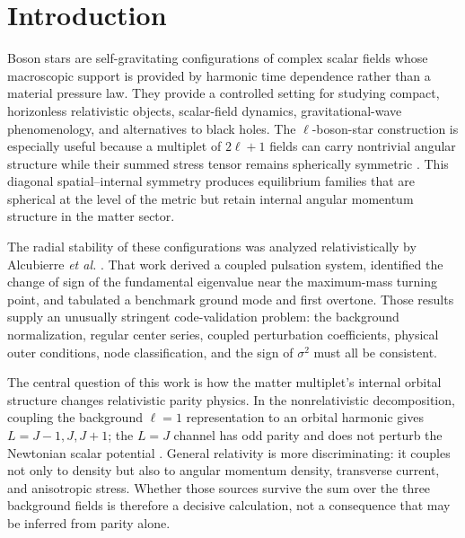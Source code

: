 \documentclass[aps,prd,preprint,onecolumn,nofootinbib,superscriptaddress,showkeys]{revtex4-2}
\newcommand{\sigmatwo}{\sigma^{2}}
\begin{document}
\maketitle

\section{Introduction}

Boson stars are self-gravitating configurations of complex scalar fields whose macroscopic support is provided by harmonic time dependence rather than a material pressure law. They provide a controlled setting for studying compact, horizonless relativistic objects, scalar-field dynamics, gravitational-wave phenomenology, and alternatives to black holes. The $\ell$-boson-star construction is especially useful because a multiplet of $2\ell+1$ fields can carry nontrivial angular structure while their summed stress tensor remains spherically symmetric \cite{Alcubierre2018}. This diagonal spatial--internal symmetry produces equilibrium families that are spherical at the level of the metric but retain internal angular momentum structure in the matter sector.

The radial stability of these configurations was analyzed relativistically by Alcubierre \emph{et al.} \cite{Alcubierre2021}. That work derived a coupled pulsation system, identified the change of sign of the fundamental eigenvalue near the maximum-mass turning point, and tabulated a benchmark ground mode and first overtone. Those results supply an unusually stringent code-validation problem: the background normalization, regular center series, coupled perturbation coefficients, physical outer conditions, node classification, and the sign of $\sigmatwo$ must all be consistent.

The central question of this work is how the matter multiplet's internal orbital structure changes relativistic parity physics.  In the nonrelativistic decomposition, coupling the background $\ell=1$ representation to an orbital harmonic gives $L=J-1,J,J+1$; the $L=J$ channel has odd parity and does not perturb the Newtonian scalar potential \cite{ChavezNambo2024}.  General relativity is more discriminating: it couples not only to density but also to angular momentum density, transverse current, and anisotropic stress.  Whether those sources survive the sum over the three background fields is therefore a decisive calculation, not a consequence that may be inferred from parity alone.
\end{document}
